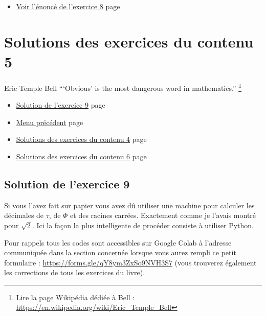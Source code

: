 \documentclass[a4paper,11pt]{book}
\begin{document}
\begin{itemize}
\item \hyperref[org71eb39f]{Voir l'énoncé de l'exercice 8}
page~\pageref{page:sec2.4.5exo8}
\end{itemize}

\clearpage
\chapter{Solutions des exercices du contenu 5}
\label{sec:orgde8f257}
\label{orge89e966}
\label{page:sec8.5sols-cont5}

\begin{myquote}{Eric Temple Bell}
\enquote{‘Obvious’ is the most dangerous word in mathematics.}
\footnote{Lire la page Wikipédia dédiée à Bell : \url{https://en.wikipedia.org/wiki/Eric_Temple_Bell}}
\end{myquote}


\clearpage

\label{org6225072}
\label{page:sols-cont5-menu}
\begin{itemize}
\item \hyperref[orgd0fbac8]{Solution de l'exercice 9} page \pageref{page:sec8.5.1sol9}
\item \hyperref[orgd150cd0]{Menu précédent} page \pageref{page:sols-contents-menu}
\item \hyperref[org74bc845]{Solutions des exercices du contenu 4} page \pageref{page:sec8.4sols-cont4}
\item \hyperref[org4cedc13]{Solutions des exercices du contenu 6} page \pageref{page:sec8.6sols-cont6}
\end{itemize}


\clearpage

\section{Solution de l'exercice 9}
\label{sec:orgbce5e8e}
\label{orgd0fbac8}
\label{page:sec8.5.1sol9}

Si vous l'avez fait sur papier vous avez dû utiliser une machine
pour calculer les décimales de \(\tau\), de \(\Phi\) et des racines
carrées. Exactement comme je l'avais montré pour \(\sqrt{2}\). Ici
la façon la plus intelligente de procéder consiste à utiliser
Python.

Pour rappels tous les codes sont accessibles sur Google Colab à
l'adresse communiquée dans la section concernée lorsque vous
aurez rempli ce petit formulaire : \url{https://forms.gle/qY8ym3ZxSo9NVH3S7}
(vous trouverez également les corrections de tous les exercices du
livre).
\end{document}

